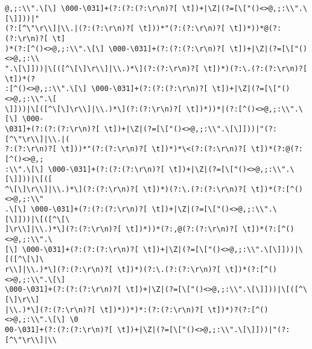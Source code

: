 \documentclass[14pt]{beamer}
\begin{document}
\begin{frame}[fragile]
\begin{lstlisting}
@,;:\\".\[\] \000-\031]+(?:(?:(?:\r\n)?[ \t])+|\Z|(?=[\["()<>@,;:\\".\[\]]))|"
(?:[^\"\r\\]|\\.|(?:(?:\r\n)?[ \t]))*"(?:(?:\r\n)?[ \t])*))*@(?:(?:\r\n)?[ \t]
)*(?:[^()<>@,;:\\".\[\] \000-\031]+(?:(?:(?:\r\n)?[ \t])+|\Z|(?=[\["()<>@,;:\\
".\[\]]))|\[([^\[\]\r\\]|\\.)*\](?:(?:\r\n)?[ \t])*)(?:\.(?:(?:\r\n)?[ \t])*(?
:[^()<>@,;:\\".\[\] \000-\031]+(?:(?:(?:\r\n)?[ \t])+|\Z|(?=[\["()<>@,;:\\".\[
\]]))|\[([^\[\]\r\\]|\\.)*\](?:(?:\r\n)?[ \t])*))*|(?:[^()<>@,;:\\".\[\] \000-
\031]+(?:(?:(?:\r\n)?[ \t])+|\Z|(?=[\["()<>@,;:\\".\[\]]))|"(?:[^\"\r\\]|\\.|(
?:(?:\r\n)?[ \t]))*"(?:(?:\r\n)?[ \t])*)*\<(?:(?:\r\n)?[ \t])*(?:@(?:[^()<>@,;
:\\".\[\] \000-\031]+(?:(?:(?:\r\n)?[ \t])+|\Z|(?=[\["()<>@,;:\\".\[\]]))|\[([
^\[\]\r\\]|\\.)*\](?:(?:\r\n)?[ \t])*)(?:\.(?:(?:\r\n)?[ \t])*(?:[^()<>@,;:\\"
.\[\] \000-\031]+(?:(?:(?:\r\n)?[ \t])+|\Z|(?=[\["()<>@,;:\\".\[\]]))|\[([^\[\
]\r\\]|\\.)*\](?:(?:\r\n)?[ \t])*))*(?:,@(?:(?:\r\n)?[ \t])*(?:[^()<>@,;:\\".\
[\] \000-\031]+(?:(?:(?:\r\n)?[ \t])+|\Z|(?=[\["()<>@,;:\\".\[\]]))|\[([^\[\]\
r\\]|\\.)*\](?:(?:\r\n)?[ \t])*)(?:\.(?:(?:\r\n)?[ \t])*(?:[^()<>@,;:\\".\[\] 
\000-\031]+(?:(?:(?:\r\n)?[ \t])+|\Z|(?=[\["()<>@,;:\\".\[\]]))|\[([^\[\]\r\\]
|\\.)*\](?:(?:\r\n)?[ \t])*))*)*:(?:(?:\r\n)?[ \t])*)?(?:[^()<>@,;:\\".\[\] \0
00-\031]+(?:(?:(?:\r\n)?[ \t])+|\Z|(?=[\["()<>@,;:\\".\[\]]))|"(?:[^\"\r\\]|\\

\end{lstlisting}
\end{frame}
\end{document}

